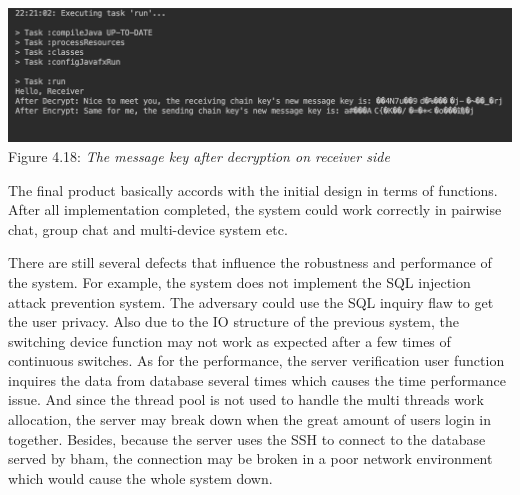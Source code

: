 \begin{center}
\includegraphics[scale=.55]{../4-Implementation/resources/key-receiver.png}\\
Figure 4.18: \textit{The message key after decryption on receiver side}
\end{center}

The final product basically accords with the initial design in terms of functions. After all implementation completed, the system could work correctly in pairwise chat, group chat and multi-device system etc.

There are still several defects that influence the robustness and performance of the system. For example, the system does not implement the SQL injection attack prevention system. The adversary could use the SQL inquiry flaw to get the user privacy. Also due to the IO structure of the previous system, the switching device function may not work as expected after a few times of continuous switches. As for the performance, the server verification user function inquires the data from database several times which causes the time performance issue. And since the thread pool is not used to handle the multi threads work allocation, the server may break down when the great amount of users login in together. Besides, because the server uses the SSH to connect to the database served by bham, the connection may be broken in a poor network environment which would cause the whole system down.

\clearpage